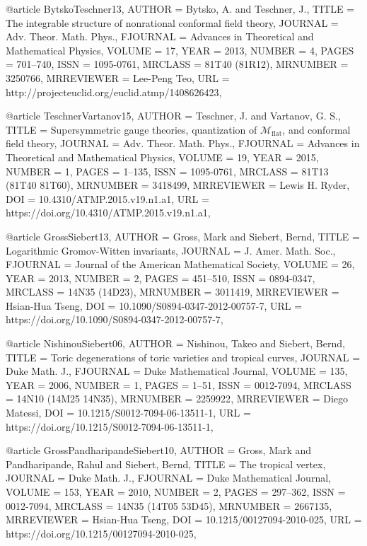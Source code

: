 @article {BytskoTeschner13,
    AUTHOR = {Bytsko, A. and Teschner, J.},
     TITLE = {The integrable structure of nonrational conformal field
              theory},
   JOURNAL = {Adv. Theor. Math. Phys.},
  FJOURNAL = {Advances in Theoretical and Mathematical Physics},
    VOLUME = {17},
      YEAR = {2013},
    NUMBER = {4},
     PAGES = {701--740},
      ISSN = {1095-0761},
   MRCLASS = {81T40 (81R12)},
  MRNUMBER = {3250766},
MRREVIEWER = {Lee-Peng Teo},
       URL = {http://projecteuclid.org/euclid.atmp/1408626423},
}

@article {TeschnerVartanov15,
    AUTHOR = {Teschner, J. and Vartanov, G. S.},
     TITLE = {Supersymmetric gauge theories, quantization of {$\mathcal{M}_{\text{flat}}$}, and conformal field theory},
   JOURNAL = {Adv. Theor. Math. Phys.},
  FJOURNAL = {Advances in Theoretical and Mathematical Physics},
    VOLUME = {19},
      YEAR = {2015},
    NUMBER = {1},
     PAGES = {1--135},
      ISSN = {1095-0761},
   MRCLASS = {81T13 (81T40 81T60)},
  MRNUMBER = {3418499},
MRREVIEWER = {Lewis H. Ryder},
       DOI = {10.4310/ATMP.2015.v19.n1.a1},
       URL = {https://doi.org/10.4310/ATMP.2015.v19.n1.a1},
}

@article {GrossSiebert13,
    AUTHOR = {Gross, Mark and Siebert, Bernd},
     TITLE = {Logarithmic {G}romov-{W}itten invariants},
   JOURNAL = {J. Amer. Math. Soc.},
  FJOURNAL = {Journal of the American Mathematical Society},
    VOLUME = {26},
      YEAR = {2013},
    NUMBER = {2},
     PAGES = {451--510},
      ISSN = {0894-0347},
   MRCLASS = {14N35 (14D23)},
  MRNUMBER = {3011419},
MRREVIEWER = {Hsian-Hua Tseng},
       DOI = {10.1090/S0894-0347-2012-00757-7},
       URL = {https://doi.org/10.1090/S0894-0347-2012-00757-7},
}

@article {NishinouSiebert06,
    AUTHOR = {Nishinou, Takeo and Siebert, Bernd},
     TITLE = {Toric degenerations of toric varieties and tropical curves},
   JOURNAL = {Duke Math. J.},
  FJOURNAL = {Duke Mathematical Journal},
    VOLUME = {135},
      YEAR = {2006},
    NUMBER = {1},
     PAGES = {1--51},
      ISSN = {0012-7094},
   MRCLASS = {14N10 (14M25 14N35)},
  MRNUMBER = {2259922},
MRREVIEWER = {Diego Matessi},
       DOI = {10.1215/S0012-7094-06-13511-1},
       URL = {https://doi.org/10.1215/S0012-7094-06-13511-1},
}

@article {GrossPandharipandeSiebert10,
    AUTHOR = {Gross, Mark and Pandharipande, Rahul and Siebert, Bernd},
     TITLE = {The tropical vertex},
   JOURNAL = {Duke Math. J.},
  FJOURNAL = {Duke Mathematical Journal},
    VOLUME = {153},
      YEAR = {2010},
    NUMBER = {2},
     PAGES = {297--362},
      ISSN = {0012-7094},
   MRCLASS = {14N35 (14T05 53D45)},
  MRNUMBER = {2667135},
MRREVIEWER = {Hsian-Hua Tseng},
       DOI = {10.1215/00127094-2010-025},
       URL = {https://doi.org/10.1215/00127094-2010-025},
}

